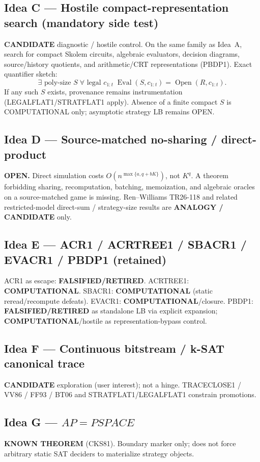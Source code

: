 \documentclass[11pt]{article}
\begin{document}
\subsection*{Idea C --- Hostile compact-representation search (mandatory side test)}
\textbf{CANDIDATE} diagnostic / hostile control. On the same family as Idea~A, search for
compact Skolem circuits, algebraic evaluators, decision diagrams, source/history quotients,
and arithmetic/CRT representations (PBDP1). Exact quantifier sketch:
\[
\exists\text{ poly-size }S\;\forall\text{ legal }c_{1:t}\;
\operatorname{Eval}(S,c_{1:t})=\operatorname{Open}(R,c_{1:t}).
\]
If any such $S$ exists, provenance remains instrumentation (LEGALFLAT1/STRATFLAT1 apply).
Absence of a finite compact $S$ is COMPUTATIONAL only; asymptotic strategy LB remains OPEN.

\subsection*{Idea D --- Source-matched no-sharing / direct-product}
\textbf{OPEN.} Direct simulation costs $O(n^{\max\{a,q+bK\}})$, not $K^q$.
A theorem forbidding sharing, recomputation, batching, memoization, and algebraic oracles
on a source-matched game is missing. Ren--Williams TR26-118 and related restricted-model
direct-sum / strategy-size results are \textbf{ANALOGY / CANDIDATE} only.

\subsection*{Idea E --- ACR1 / ACRTREE1 / SBACR1 / EVACR1 / PBDP1 (retained)}
ACR1 as escape: \textbf{FALSIFIED/RETIRED}.
ACRTREE1: \textbf{COMPUTATIONAL}.
SBACR1: \textbf{COMPUTATIONAL} (static reread/recompute defeats).
EVACR1: \textbf{COMPUTATIONAL}/closure.
PBDP1: \textbf{FALSIFIED/RETIRED} as standalone LB via explicit expansion;
\textbf{COMPUTATIONAL}/hostile as representation-bypass control.

\subsection*{Idea F --- Continuous bitstream / k-SAT canonical trace}
\textbf{CANDIDATE} exploration (user interest); not a hinge. TRACECLOSE1 / VV86 / FF93 / BT06
and STRATFLAT1/LEGALFLAT1 constrain promotions.

\subsection*{Idea G --- $AP=PSPACE$}
\textbf{KNOWN THEOREM} (CKS81). Boundary marker only; does not force arbitrary static SAT
deciders to materialize strategy objects.
\end{document}
